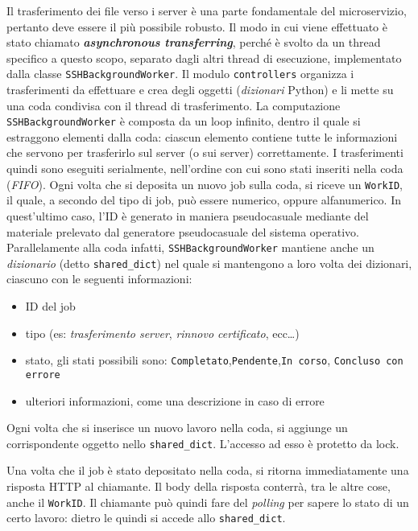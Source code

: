 Il trasferimento dei file verso i server è una parte fondamentale del microservizio,
pertanto deve essere il più possibile robusto.
Il modo in cui viene effettuato è stato chiamato \textbf{\textit{asynchronous transferring}},
perché è svolto da un thread specifico a questo scopo, separato dagli altri thread di
esecuzione, implementato dalla classe \texttt{SSHBackgroundWorker}.
Il modulo \texttt{controllers} organizza i trasferimenti da effettuare e crea degli
oggetti (\textit{dizionari} Python) e li mette su una coda condivisa con il thread di
trasferimento.
La computazione \texttt{SSHBackgroundWorker} è composta da un loop infinito, dentro
il quale si estraggono elementi dalla coda: ciascun elemento contiene tutte le informazioni
che servono per trasferirlo sul server (o sui server) correttamente. I trasferimenti
quindi sono eseguiti serialmente, nell'ordine con cui sono stati inseriti
nella coda (\textit{FIFO}).
Ogni volta che si deposita un nuovo job sulla coda, si riceve un \texttt{WorkID}, il quale,
a secondo del tipo di job, può essere numerico, oppure alfanumerico. In quest'ultimo
caso, l'ID è generato in maniera pseudocasuale mediante del materiale
prelevato dal generatore pseudocasuale del sistema operativo.
Parallelamente alla coda infatti, \texttt{SSHBackgroundWorker} mantiene anche un \textit{dizionario}
(detto \texttt{shared\_dict})
nel quale si mantengono a loro volta dei dizionari, ciascuno con le seguenti informazioni:
\begin{itemize}
	\item ID del job
	\item tipo (es: \textit{trasferimento server}, \textit{rinnovo certificato}, ecc\ldots)
	\item stato, gli stati possibili sono: \texttt{Completato},\texttt{Pendente},\texttt{In corso},
	      \texttt{Concluso con errore}
	\item ulteriori informazioni, come una descrizione in caso di errore
\end{itemize}
Ogni volta che si inserisce un nuovo lavoro nella coda, si aggiunge un corrispondente oggetto
nello \texttt{shared\_dict}. L'accesso ad esso è protetto da lock.

Una volta che il job è stato depositato nella coda, si ritorna immediatamente una risposta HTTP
al chiamante. Il body della risposta conterrà, tra le altre cose, anche il \texttt{WorkID}.
Il chiamante può quindi fare del \textit{polling} per sapere lo stato di un certo lavoro: dietro
le quindi si accede allo \texttt{shared\_dict}.

